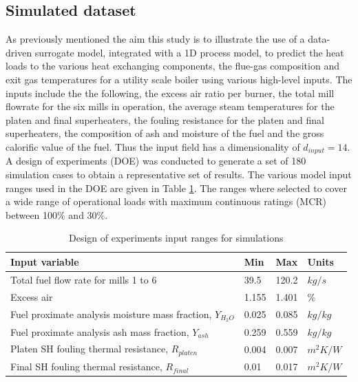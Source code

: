 \documentclass[a4paper,fleqn]{cas-sc}
\begin{document}
\subsection{Simulated dataset}
As previously mentioned the aim this study is to illustrate the use of a data-driven surrogate model, integrated with a 1D process model, to predict the heat loads to the various heat exchanging components, the flue-gas composition and exit gas temperatures for a utility scale boiler using various high-level inputs. The inputs include the the following, the excess air ratio per burner, the total mill flowrate for the six mills in operation, the average steam temperatures for the platen and final superheaters, the fouling resistance for the platen and final superheaters, the composition of ash and moisture of the fuel and the gross calorific value of the fuel. Thus the input field has a dimensionality of $d_{input}=14$.\\

A design of experiments (DOE) was conducted to generate a set of 180 simulation cases to obtain a representative set of results. The various model input ranges used in the DOE are given in Table \ref{tbl_doe}. The ranges where selected to cover a wide range of operational loads with maximum continuous ratings (MCR) between 100\% and 30\%.

\begin{table}[h!]
\caption{Design of experiments input ranges for  simulations}\label{tbl_doe}
\begin{tabular*}{\tblwidth}{p{}p{}p{}p{}}
\toprule
 Input variable& Min& Max& Units \\ %
\midrule
 Total fuel flow rate for mills 1 to 6 & 39.5 & 120.2 & $kg/s$ \\
 Excess air & 1.155 & 1.401 & $\%$\\
 Fuel proximate analysis moisture mass fraction, $Y_{H_2O}$ & 0.025 & 0.085 & $kg/kg$ \\
 Fuel proximate analysis ash mass fraction, $Y_{ash}$  & 0.259 & 0.559 & $kg/kg$ \\
 Platen SH fouling thermal resistance, $R_{platen}$  & 0.004 & 0.007 & $m^2K/W$ \\
 Final SH fouling thermal resistance, $R_{final}$  &0.01 & 0.017 & $m^2K/W$ \\
\bottomrule
\end{tabular*}
\end{table}
\end{document}
